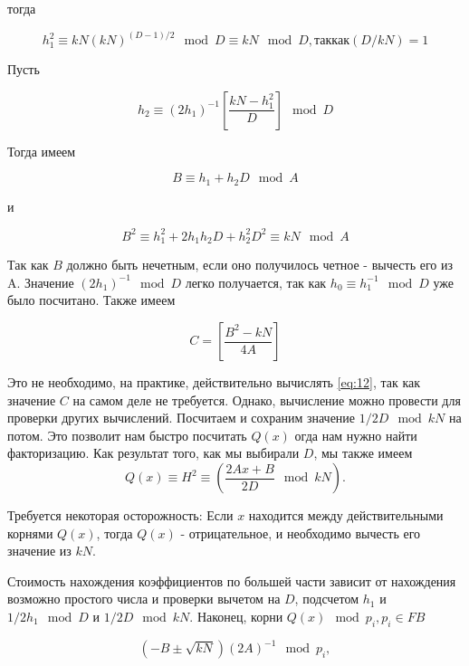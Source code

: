 \documentclass[a4paper,12pt]{report}
\begin{document}
тогда

\begin{equation}\label{eq:8}
h_1^2 \equiv kN(kN)^{(D-1)/2} \mod D \equiv kN \mod D, так как (D/kN) = 1
\end{equation}

Пусть

\begin{equation}\label{eq:9}
h_2 \equiv (2h_1)^{-1}[\frac{kN - h_1^2}{D}] \mod D
\end{equation}

Тогда имеем

\begin{equation}\label{eq:10}
B \equiv h_1 + h_2D \mod A
\end{equation}

и

\begin{equation}\label{eq:11}
B^2 \equiv h_1^2 + 2h_1h_2D + h_2^2D^2 \equiv kN \mod A
\end{equation}

Так как $B$ должно быть нечетным, если оно получилось четное - вычесть его из A.
Значение $(2h_1)^{-1} \mod D$ легко получается, так как $h_0 \equiv h_1^{-1} \mod D$ уже было посчитано. Также имеем 

\begin{equation}\label{eq:12}
C = [\frac{B^2 - kN}{4A}]
\end{equation}

Это не необходимо, на практике, действительно вычислять \eqref{eq:12}, так как значение $C$ на самом деле не требуется. Однако, вычисление можно провести для проверки других вычислений. Посчитаем и сохраним значение $1/2D \mod kN$ на потом. Это позволит нам быстро посчитать $Q(x)$ огда нам нужно найти факторизацию.
Как результат того, как мы выбирали $D$, мы также имеем
\begin{equation}\label{eq:13}
Q(x) \equiv H^2 \equiv (\frac{2Ax + B}{2D} \mod kN).
\end{equation}

Требуется некоторая осторожность: Если $x$ находится между действительными корнями $Q(x)$, тогда $Q(x)$ - отрицательное, и необходимо вычесть его значение из $kN$.

Стоимость нахождения коэффициентов по большей части зависит от нахождения возможно простого числа и проверки вычетом на $D$, подсчетом $h_1$ и $1/2h_1 \mod D$ и $1/2D \mod kN$.
Наконец, корни $Q(x) \mod p_i, p_i \in FB$ 

\begin{equation}\label{eq:14}
(-B \pm \sqrt{kN})(2A)^{-1} \mod p_i,
\end{equation}
\end{document}

